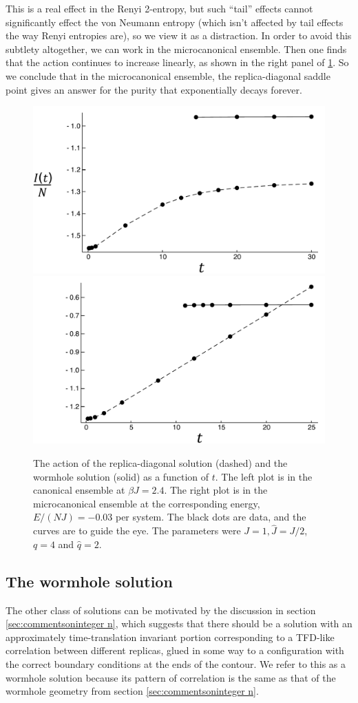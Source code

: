 \documentclass[11pt]{article}
\numberwithin{equation}{section}
\begin{document}
This is a real effect in the Renyi 2-entropy, but such ``tail'' effects cannot significantly effect the von Neumann entropy (which isn't affected by tail effects the way Renyi entropies are), so we view it as a distraction. In order to avoid this subtlety altogether, we can work in the microcanonical ensemble. Then one finds that the action continues to increase linearly, as shown in the right panel of \ref{figAction}. So we conclude that in the microcanonical ensemble, the replica-diagonal saddle point gives an answer for the purity that exponentially decays forever.

\begin{figure}[t]
\begin{center}
\includegraphics[width = .48\textwidth]{images/SYK_canonical.pdf}
\includegraphics[width = .49\textwidth]{images/SYK_microcanonical.pdf}
\caption{{\small The action of the replica-diagonal solution (dashed) and the wormhole solution (solid) as a function of $t$. The left plot is in the canonical ensemble at $\beta J = 2.4$. The right plot is in the microcanonical ensemble at the corresponding energy, $E/(NJ) = -0.03$ per system. The black dots are data, and the curves are to guide the eye. The parameters were $J = 1, \hat{J} = J/2$, $q = 4$ and $\hat{q} = 2$.}}\label{figAction}
\end{center}
\end{figure}

\subsection{The wormhole solution}
The other class of solutions can be motivated by the discussion in section \ref{sec:commentsoninteger n}, which suggests that there should be a solution with an approximately time-translation invariant portion corresponding to a TFD-like correlation between different replicas, glued in some way to a configuration with the correct boundary conditions at the ends of the contour. We refer to this as a wormhole solution because its pattern of correlation is the same as that of the wormhole geometry from section \ref{sec:commentsoninteger n}.
\end{document}
